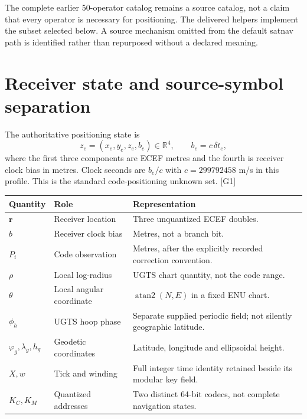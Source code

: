 \documentclass[11pt,a4paper]{article}
\newcommand{\ext}[1]{\textcolor{muted}{[#1]}}
\newcommand{\R}{\mathbb R}\newcommand{\N}{\mathbb N}\newcommand{\Z}{\mathbb Z}\newcommand{\B}{\{0,1\}}
\begin{document}
The complete earlier 50-operator catalog remains a source catalog, not a claim that
every operator is necessary for positioning. The delivered helpers implement the
subset selected below. A source mechanism omitted from the default satnav path is
identified rather than repurposed without a declared meaning.
\clearpage

\section{Receiver state and source-symbol separation}
The authoritative positioning state is
\begin{equation}
z_e=(x_e,y_e,z_e,b_e)\in\R^4,\qquad b_e=c\,\delta t_e,
\end{equation}
where the first three components are ECEF metres and the fourth is receiver clock
bias in metres. Clock seconds are $b_e/c$ with $c=299792458$ m/s in this profile.
This is the standard code-positioning unknown set. \ext{G1}

\par\small
\begin{tabularx}{\textwidth}{@{}P{.22\textwidth}P{.30\textwidth}Y@{}}\toprule
\textbf{Quantity} & \textbf{Role} & \textbf{Representation}\\\midrule
$\boldsymbol r$ & Receiver location & Three unquantized ECEF doubles.\\
$b$ & Receiver clock bias & Metres, not a branch bit.\\
$P_i$ & Code observation & Metres, after the explicitly recorded correction convention.\\
$\rho$ & Local log-radius & UGTS chart quantity, not the code range.\\
$\theta$ & Local angular coordinate & $\operatorname{atan2}(N,E)$ in a fixed ENU chart.\\
$\phi_h$ & UGTS hoop phase & Separate supplied periodic field; not silently geographic latitude.\\
$\varphi_g,\lambda_g,h_g$ & Geodetic coordinates & Latitude, longitude and ellipsoidal height.\\
$X,w$ & Tick and winding & Full integer time identity retained beside its modular key field.\\
$K_C,K_M$ & Quantized addresses & Two distinct 64-bit codecs, not complete navigation states.\\\bottomrule
\end{tabularx}
\par\normalsize
\end{document}
